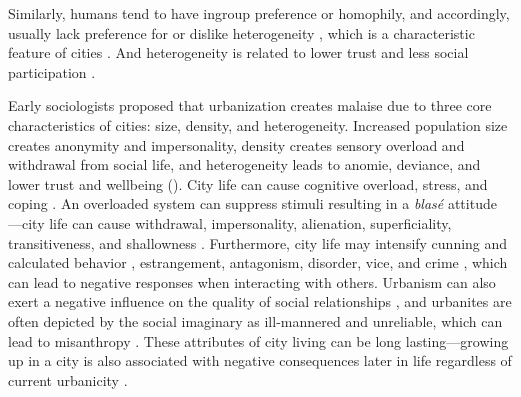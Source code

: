 \documentclass[11pt, letterpaper]{article}
\begin{document}
\begin{spacing}{1.4}
Similarly, humans tend to have ingroup preference or homophily, and
accordingly, usually lack preference for or dislike heterogeneity
\citep{smith14,mcpherson01,bleidorn16,putnam07}, which is a characteristic feature
of cities \citep{wirth38,amin06,thrift05}. And heterogeneity is related to lower trust and less social participation \citep{alesina99,alesina00,luttmer01,alesina02,rodriguez2019does}.


Early sociologists  
 proposed that urbanization creates malaise due to three core characteristics of cities: size, density, and heterogeneity. Increased population size creates anonymity and
 impersonality, density creates sensory overload and withdrawal from social
 life, and heterogeneity leads to anomie, deviance, and lower trust and wellbeing (\citet{park84,
   simmel03, tonnies57, wirth38,putnam07,aok_brfss_segregation15,herbst14,postmes02,vogt07,smelser99}).
%
%
%
City life can cause cognitive overload, stress, and coping \citep{simmel03, milgram70,lederbogen11}. An overloaded system can suppress stimuli resulting in a \textit{blas\'e} attitude
\citep{simmel03}---city life can cause withdrawal, impersonality, alienation, superficiality, transitiveness, and shallowness \citep{wirth38}. Furthermore, city life may intensify cunning and calculated behavior \citep{tonnies57}, estrangement, antagonism, disorder, vice, and crime
\citep{milgram70,park15,park84,bettencourt10b}, which can lead to negative 
responses when interacting with others.
%
Urbanism can also exert a negative influence on the quality of social relationships \citep{wilson85}, and urbanites are often depicted by the social imaginary as ill-mannered and unreliable, which can lead to misanthropy
\citep[e.g.,][]{aokCityBook15,aok-sizeFetish17}. These attributes of city living
can be long lasting---growing up in a city is also associated with negative
consequences later in life regardless of current urbanicity \citep{lederbogen11,aok20}.


\end{spacing}
\end{document}
